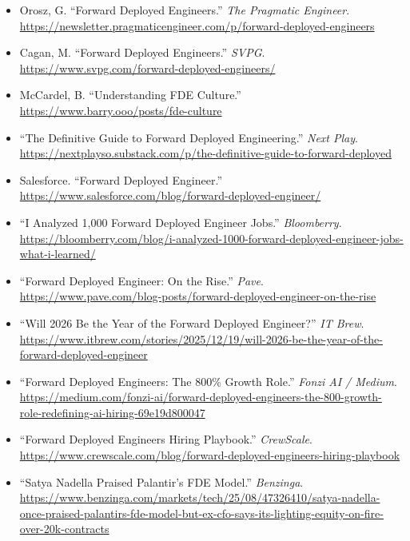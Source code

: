 {\small\sloppy
\begin{itemize}[itemsep=1pt]
    \item Orosz, G. ``Forward Deployed Engineers.''
        \textit{The Pragmatic Engineer}.
        \url{https://newsletter.pragmaticengineer.com/p/forward-deployed-engineers}

    \item Cagan, M. ``Forward Deployed Engineers.''
        \textit{SVPG}.
        \url{https://www.svpg.com/forward-deployed-engineers/}

    \item McCardel, B. ``Understanding FDE Culture.''
        \url{https://www.barry.ooo/posts/fde-culture}

    \item ``The Definitive Guide to Forward Deployed Engineering.''
        \textit{Next Play}.
        \url{https://nextplayso.substack.com/p/the-definitive-guide-to-forward-deployed}

    \item Salesforce. ``Forward Deployed Engineer.''
        \url{https://www.salesforce.com/blog/forward-deployed-engineer/}

    \item ``I Analyzed 1,000 Forward Deployed Engineer Jobs.''
        \textit{Bloomberry}.
        \url{https://bloomberry.com/blog/i-analyzed-1000-forward-deployed-engineer-jobs-what-i-learned/}

    \item ``Forward Deployed Engineer: On the Rise.''
        \textit{Pave}.
        \url{https://www.pave.com/blog-posts/forward-deployed-engineer-on-the-rise}

    \item ``Will 2026 Be the Year of the Forward Deployed Engineer?''
        \textit{IT Brew}.
        \url{https://www.itbrew.com/stories/2025/12/19/will-2026-be-the-year-of-the-forward-deployed-engineer}

    \item ``Forward Deployed Engineers: The 800\% Growth Role.''
        \textit{Fonzi AI / Medium}.
        \url{https://medium.com/fonzi-ai/forward-deployed-engineers-the-800-growth-role-redefining-ai-hiring-69e19d800047}

    \item ``Forward Deployed Engineers Hiring Playbook.''
        \textit{CrewScale}.
        \url{https://www.crewscale.com/blog/forward-deployed-engineers-hiring-playbook}

    \item ``Satya Nadella Praised Palantir's FDE Model.''
        \textit{Benzinga}.
        \url{https://www.benzinga.com/markets/tech/25/08/47326410/satya-nadella-once-praised-palantirs-fde-model-but-ex-cfo-says-its-lighting-equity-on-fire-over-20k-contracts}


\end{itemize}}
